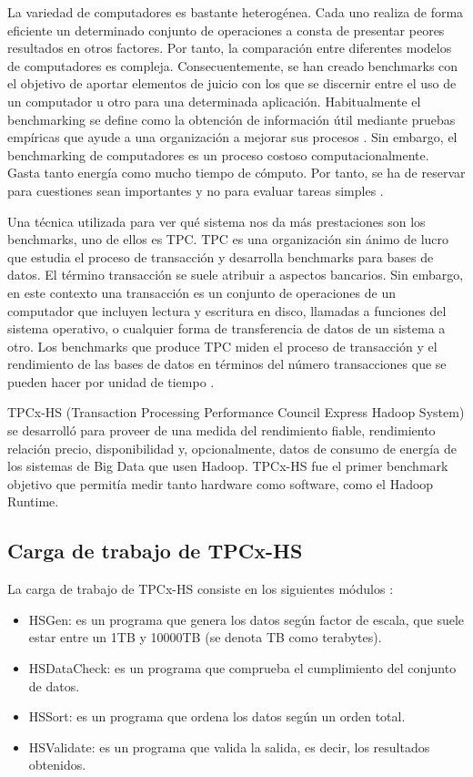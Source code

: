 \documentclass[10pt]{article}
\begin{document}
	La variedad de computadores es bastante heterogénea. Cada uno realiza de forma eficiente un determinado conjunto de operaciones a consta de presentar peores resultados en otros factores. Por tanto, la comparación entre diferentes modelos de computadores es compleja. Consecuentemente, se han creado benchmarks con el objetivo de aportar elementos de juicio con los que se discernir entre el uso de un computador u otro para una determinada aplicación. Habitualmente el benchmarking se define como la obtención de información útil mediante pruebas empíricas que ayude a una organización a mejorar sus procesos \cite{benchmarking}. Sin embargo, el benchmarking de computadores es un proceso costoso computacionalmente. Gasta tanto energía como mucho tiempo de cómputo. Por tanto, se ha de reservar para cuestiones sean importantes y no para evaluar tareas simples \cite{desv-bench}.
	
	Una técnica utilizada para ver qué sistema nos da más prestaciones son los benchmarks, uno de ellos es TPC. TPC es una organización sin ánimo de lucro que estudia el proceso de transacción y desarrolla benchmarks para bases de datos. El término transacción se suele atribuir a aspectos bancarios. Sin embargo, en este contexto una transacción es un conjunto de operaciones de un computador que incluyen lectura y escritura en disco, llamadas a funciones del sistema operativo, o cualquier forma de transferencia de datos de un sistema a otro. Los benchmarks que produce TPC miden el proceso de transacción y el rendimiento de las bases de datos en términos del número transacciones que se pueden hacer por unidad de tiempo \cite{intro-tpc}.
	
	TPCx-HS (Transaction Processing Performance Council Express Hadoop System) se desarrolló para proveer de una medida del rendimiento fiable, rendimiento relación precio, disponibilidad y, opcionalmente, datos de consumo de energía de los sistemas de Big Data que usen Hadoop. TPCx-HS fue el primer benchmark objetivo que permitía medir tanto hardware como software, como el Hadoop Runtime. \cite{info-tpc}
	
	\subsection{Carga de trabajo de TPCx-HS}
	
		La carga de trabajo de TPCx-HS consiste en los siguientes módulos \cite{tpcxhs}:
		
		\begin{itemize}
			\item HSGen: es un programa que genera los datos según factor de escala, que suele estar entre un 1TB y 10000TB (se denota TB como terabytes).
			\item HSDataCheck: es un programa que comprueba el cumplimiento del conjunto de datos.
			\item HSSort: es un programa que ordena los datos según un orden total.
			\item HSValidate: es un programa que valida la salida, es decir, los resultados obtenidos.
		\end{itemize}
	
\end{document}

